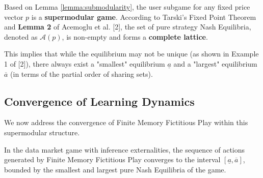 \documentclass[lettersize,journal]{IEEEtran}
\begin{document}
\begin{theorem}
\label{thm:lattice}
Based on Lemma \ref{lemma:submodularity}, the user subgame for any fixed price vector $p$ is a \textbf{supermodular game}. According to Tarski's Fixed Point Theorem and \textbf{Lemma 2} of Acemoglu et al. [2], the set of pure strategy Nash Equilibria, denoted as $\mathcal{A}(p)$, is non-empty and forms a \textbf{complete lattice}.
\end{theorem}

This implies that while the equilibrium may not be unique (as shown in Example 1 of [2]), there always exist a "smallest" equilibrium $\underline{a}$ and a "largest" equilibrium $\overline{a}$ (in terms of the partial order of sharing sets).

\subsection{Convergence of Learning Dynamics}

We now address the convergence of Finite Memory Fictitious Play within this supermodular structure.

\begin{proposition}
In the data market game with inference externalities, the sequence of actions generated by Finite Memory Fictitious Play converges to the interval $[\underline{a}, \overline{a}]$, bounded by the smallest and largest pure Nash Equilibria of the game.
\end{proposition}
\end{document}
